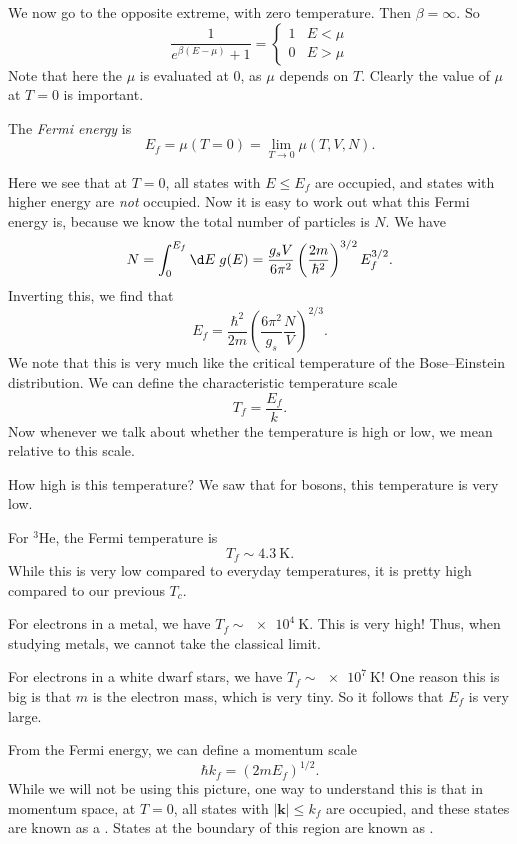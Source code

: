 \documentclass[a4paper]{article}
\begin{document}
We now go to the opposite extreme, with zero temperature. Then $\beta = \infty$. So
\[
  \frac{1}{e^{\beta (E - \mu)} + 1} =
  \begin{cases}
    1 & E < \mu\\
    0 & E > \mu
  \end{cases}
\]
Note that here the $\mu$ is evaluated at $0$, as $\mu$ depends on $T$. Clearly the value of $\mu$ at $T = 0$ is important.
\begin{defi}
  The \emph{Fermi energy} is
  \[
    E_f = \mu(T = 0) = \lim_{T \to 0} \mu(T, V, N).
  \]
\end{defi}
Here we see that at $T = 0$, all states with $E \leq E_f$ are occupied, and states with higher energy are \emph{not} occupied. Now it is easy to work out what this Fermi energy is, because we know the total number of particles is $N$. We have
\[
  N = \int_0^{E_f} \d E\; g(E) = \frac{g_s V}{6 \pi^2} \left(\frac{2m}{\hbar^2}\right)^{3/2} E_f^{3/2}.
\]
Inverting this, we find that
\[
  E_f = \frac{\hbar^2}{2m} \left(\frac{6 \pi^2}{g_s} \frac{N}{V}\right)^{2/3}.
\]
We note that this is very much like the critical temperature of the Bose--Einstein distribution. We can define the characteristic temperature scale
\[
  T_f = \frac{E_f}{k}.
\]
Now whenever we talk about whether the temperature is high or low, we mean relative to this scale.

How high is this temperature? We saw that for bosons, this temperature is very low.
\begin{eg}
  For $^3$He, the Fermi temperature is
  \[
    T_f \sim \SI{4.3}{\kelvin}.
  \]
  While this is very low compared to everyday temperatures, it is pretty high compared to our previous $T_c$.

  For electrons in a metal, we have $T_f \sim \SI{e4}{\kelvin}$. This is very high! Thus, when studying metals, we cannot take the classical limit.

  For electrons in a white dwarf stars, we have $T_f \sim \SI{e7}{\kelvin}$! One reason this is big is that $m$ is the electron mass, which is very tiny. So it follows that $E_f$ is very large.
\end{eg}

From the Fermi energy, we can define a momentum scale
\[
  \hbar k_f = (2m E_f)^{1/2}.
\]
While we will not be using this picture, one way to understand this is that in momentum space, at $T = 0$, all states with $|\mathbf{k}| \leq k_f$ are occupied, and these states are known as a . States at the boundary of this region are known as .
\end{document}
